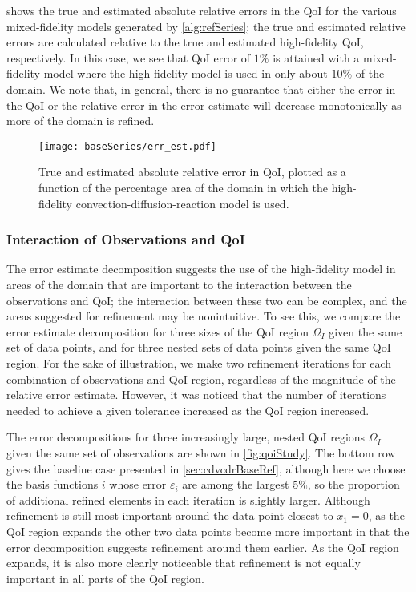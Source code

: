  shows the true and estimated absolute relative errors in the QoI for the various mixed-fidelity models generated by \cref{alg:refSeries}; the true and estimated relative errors are calculated relative to the true and estimated high-fidelity QoI, respectively. In this case, we see that QoI error of $1\%$ is attained with a mixed-fidelity model where the high-fidelity model is used in only about $10\%$ of the domain. We note that, in general, there is no guarantee that either the error in the QoI or the relative error in the error estimate will decrease monotonically as more of the domain is refined.
%
\begin{figure}[htbp]
\centering
\texttt{[image: baseSeries/err\_est.pdf]}
\caption{True and estimated absolute relative error in QoI, plotted as a function of the percentage area of the domain in which the high-fidelity convection-diffusion-reaction model is used.}
\label{fig:baseErr}
\end{figure}
%

\subsubsection{Interaction of Observations and QoI} \label{sec:qoivdata}
%
The error estimate decomposition suggests the use of the high-fidelity model in areas of the domain that are important to the interaction between the observations and QoI; the interaction between these two can be complex, and the areas suggested for refinement may be nonintuitive. To see this, we compare the error estimate decomposition for three sizes of the QoI region $\Omega_I$ given the same set of data points, and for three nested sets of data points given the same QoI region. For the sake of illustration, we make two refinement iterations for each combination of observations and QoI region, regardless of the magnitude of the relative error estimate. However, it was noticed that the number of iterations needed to achieve a given tolerance increased as the QoI region increased.

The error decompositions for three increasingly large, nested QoI regions $\Omega_I$ given the same set of observations are shown in \cref{fig:qoiStudy}. The bottom row gives the baseline case presented in \cref{sec:cdvcdrBaseRef}, although here we choose the basis functions $i$ whose error $\varepsilon_i$ are among the largest $5\%$, so the proportion of additional refined elements in each iteration is slightly larger. Although refinement is still most important around the data point closest to $x_1=0$, as the QoI region expands the other two data points become more important in that the error decomposition suggests refinement around them earlier. As the QoI region expands, it is also more clearly noticeable that refinement is not equally important in all parts of the QoI region.

